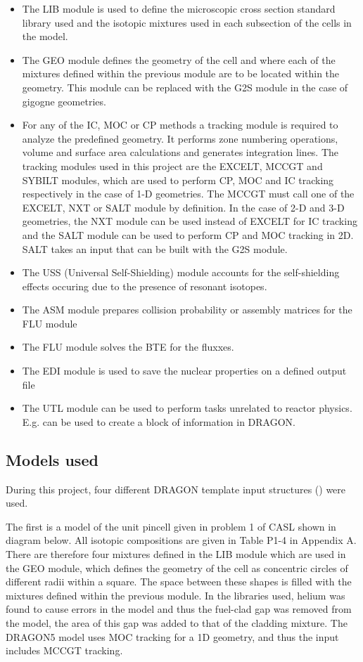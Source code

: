 \documentclass[12pt]{article}
\begin{document}
\begin{itemize}
    \item The LIB module is used to define the microscopic cross section standard library used and the isotopic mixtures used in each subsection of the cells in the model. \item The GEO module defines the geometry of the cell and where each of the mixtures defined within the previous module are to be located within the geometry. This module can be replaced with the G2S module in the case of gigogne geometries. \item For any of the IC, MOC or CP methods a tracking module is required to analyze the predefined geometry. It performs zone numbering operations, volume and surface area calculations and generates integration lines. The tracking modules used in this project are the EXCELT, MCCGT and SYBILT modules, which are used to perform CP, MOC and IC tracking respectively in the case of 1-D geometries. The MCCGT must call one of the EXCELT, NXT or SALT module by definition. In the case of 2-D and 3-D geometries, the NXT module can be used instead of EXCELT for IC tracking and the SALT module can be used to perform CP and MOC tracking in 2D. SALT takes an input that can be built with the G2S module. \item The USS (Universal Self-Shielding) module accounts for the self-shielding effects occuring due to the presence of resonant isotopes. \item The ASM module prepares collision probability or assembly matrices for the FLU module \item The FLU module solves the BTE for the fluxxes. \item The EDI module is used to save the nuclear properties on a defined output file \item The UTL module can be used to perform tasks unrelated to reactor physics. E.g. can be used to create a block of information in DRAGON. 
\end{itemize} 

 \subsection{Models used}
 
 During this project, four different DRAGON template input structures (\href{https://github.com/alex-stuart/LRS_internship_repo/tree/main/dragon/filesToRun/x2mFiles}{\color{blue}{here}}) were used.  

The first is a model of the unit pincell given in problem 1 of CASL \cite{godfrey2013vera} shown in diagram below. All isotopic compositions are given in Table P1-4 in Appendix A. There are therefore four mixtures defined in the LIB module which are used in the GEO module, which defines the geometry of the cell as concentric circles of different radii within a square. The space between these shapes is filled with the mixtures defined within the previous module. In the libraries used, helium was found to cause errors in the model and thus the fuel-clad gap was removed from the model, the area of this gap was added to that of the cladding mixture. 
The DRAGON5 model uses MOC tracking for a 1D geometry, and thus the input includes MCCGT tracking.
\end{document}
